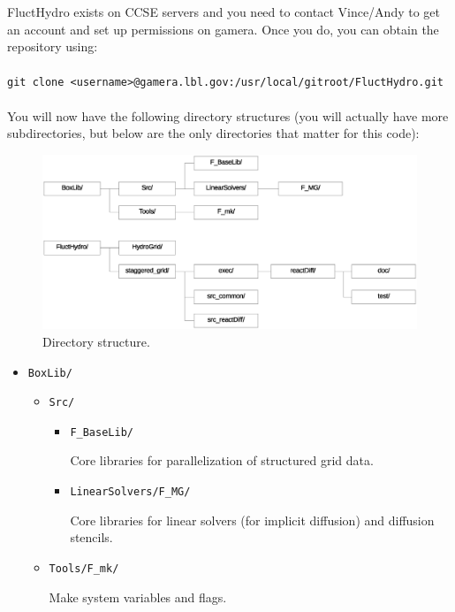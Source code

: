 \documentclass[final]{siamltex}
\begin{document}
FluctHydro exists on CCSE servers and you need to contact Vince/Andy to get an account
and set up permissions on gamera.  Once you do, you can obtain the repository using:\\ \\
{\tt git clone <username>@gamera.lbl.gov:/usr/local/gitroot/FluctHydro.git}\\ \\
You will now have the following directory structures (you will actually have
more subdirectories, but below are the only directories that matter for this code):\\
\begin{figure}[tb]
\centering
\includegraphics[width=6in]{./directory}
\caption{\label{fig:directory}Directory structure.}
\end{figure}
\begin{itemize}

\item {\tt BoxLib/}

\begin{itemize}

\item {\tt Src/}

\begin{itemize}

\item {\tt F\_BaseLib/}

Core libraries for parallelization of structured grid data.

\item {\tt LinearSolvers/F\_MG/}

Core libraries for linear solvers (for implicit diffusion) and diffusion stencils.

\end{itemize}
\end{itemize}

\begin{itemize}

\item {\tt Tools/F\_mk/}

Make system variables and flags.

\end{itemize}
\end{itemize}
\end{document}
